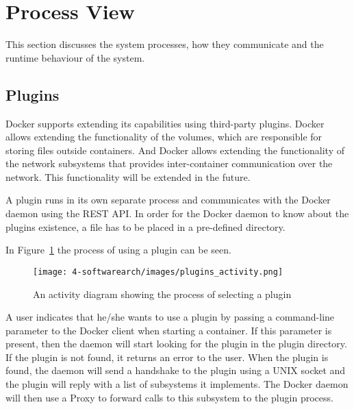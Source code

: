 
\section{Process View}
\label{sec:viewprocess}
This section discusses the system processes, how they communicate and the runtime behaviour of the system.

\subsection{Plugins}
\label{sec:processplugins}
Docker supports extending its capabilities using third-party plugins. Docker allows extending the functionality of the volumes, which are responsible for storing files outside containers. And Docker allows extending the functionality of the network subsystems that provides inter-container communication over the network. This functionality will be extended in the future\cite{dockerplugindocs}.

A plugin runs in its own separate process and communicates with the Docker daemon using the REST API. In order for the Docker daemon to know about the plugins existence, a file has to be placed in a pre-defined directory. %

In Figure~\ref{fig:activity_plugin} the process of using a plugin can be seen.
\begin{figure}[H]
\caption{An activity diagram showing the process of selecting a plugin}
\centering
\texttt{[image: 4-softwarearch/images/plugins\_activity.png]}
\label{fig:activity_plugin}
\end{figure}

A user indicates that he/she wants to use a plugin by passing a command-line parameter to the Docker client when starting a container. If this parameter is present, then the daemon will start looking for the plugin in the plugin directory. If the plugin is not found, it returns an error to the user. 
When the plugin is found, the daemon will send a handshake to the plugin using a UNIX socket and the plugin will reply with a list of subsystems it implements. 
The Docker daemon will then use a Proxy to forward calls to this subsystem to the plugin process.
